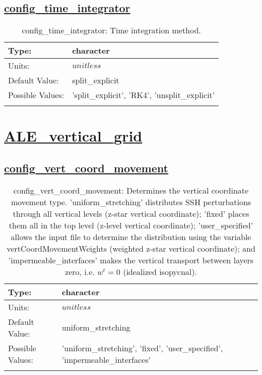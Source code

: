 \subsection[config\_time\_integrator]{\hyperref[sec:nm_tab_time_integration]{config\_time\_integrator}}
\label{subsec:nm_sec_config_time_integrator}
\begin{center}
\begin{longtable}{| p{2.0in} || p{4.0in} |}
    \hline
    Type: & character \\
    \hline
    Units: & $unitless$ \\
    \hline
    Default Value: & split\_explicit \\
    \hline
    Possible Values: & 'split\_explicit', 'RK4', 'unsplit\_explicit' \\
    \hline
    \caption{config\_time\_integrator: Time integration method.}
\end{longtable}
\end{center}
\section[ALE\_vertical\_grid]{\hyperref[sec:nm_tab_ALE_vertical_grid]{ALE\_vertical\_grid}}
\label{sec:nm_sec_ALE_vertical_grid}
\subsection[config\_vert\_coord\_movement]{\hyperref[sec:nm_tab_ALE_vertical_grid]{config\_vert\_coord\_movement}}
\label{subsec:nm_sec_config_vert_coord_movement}
\begin{center}
\begin{longtable}{| p{2.0in} || p{4.0in} |}
    \hline
    Type: & character \\
    \hline
    Units: & $unitless$ \\
    \hline
    Default Value: & uniform\_stretching \\
    \hline
    Possible Values: & 'uniform\_stretching', 'fixed', 'user\_specified', 'impermeable\_interfaces' \\
    \hline
    \caption{config\_vert\_coord\_movement:  Determines the vertical coordinate movement type. 'uniform\_stretching' distributes SSH perturbations through all vertical levels (z-star vertical coordinate); 'fixed' places them all in the top level (z-level vertical coordinate); 'user\_specified' allows the input file to determine the distribution using the variable vertCoordMovementWeights (weighted z-star vertical coordinate); and 'impermeable\_interfaces' makes the vertical transport between layers zero, i.e.  $w^t=0$  (idealized isopycnal).}
\end{longtable}
\end{center}

